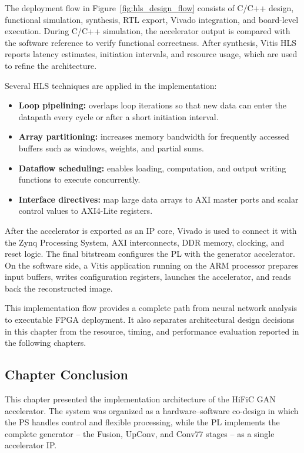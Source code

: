 The deployment flow in Figure~\ref{fig:hls_design_flow} consists of C/C++ design, functional simulation, synthesis, RTL export, Vivado integration, and board-level execution. During C/C++ simulation, the accelerator output is compared with the software reference to verify functional correctness. After synthesis, Vitis HLS reports latency estimates, initiation intervals, and resource usage, which are used to refine the architecture.

Several HLS techniques are applied in the implementation:
\begin{itemize}
    \item \textbf{Loop pipelining:} overlaps loop iterations so that new data can enter the datapath every cycle or after a short initiation interval.
    \item \textbf{Array partitioning:} increases memory bandwidth for frequently accessed buffers such as windows, weights, and partial sums.
    \item \textbf{Dataflow scheduling:} enables loading, computation, and output writing functions to execute concurrently.
    \item \textbf{Interface directives:} map large data arrays to AXI master ports and scalar control values to AXI4-Lite registers.
\end{itemize}

After the accelerator is exported as an IP core, Vivado is used to connect it with the Zynq Processing System, AXI interconnects, DDR memory, clocking, and reset logic. The final bitstream configures the PL with the generator accelerator. On the software side, a Vitis application running on the ARM processor prepares input buffers, writes configuration registers, launches the accelerator, and reads back the reconstructed image.

This implementation flow provides a complete path from neural network analysis to executable FPGA deployment. It also separates architectural design decisions in this chapter from the resource, timing, and performance evaluation reported in the following chapters.

\subsection{Chapter Conclusion}

This chapter presented the implementation architecture of the HiFiC GAN accelerator. The system was organized as a hardware--software co-design in which the PS handles control and flexible processing, while the PL implements the complete generator -- the Fusion, UpConv, and Conv77 stages -- as a single accelerator IP.

